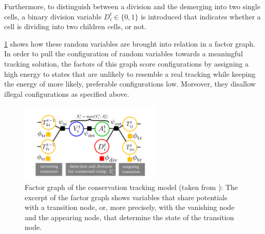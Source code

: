 Furthermore, to distinguish between a division and the demerging into two single cells, a
binary division variable $D_i^t \in \{0, 1\}$ is introduced that indicates whether a cell is dividing
into two children cells, or not.

\cref{fig:conservation-fg} shows how these random variables are brought into relation in a factor
graph. In order to pull the configuration of random variables towards a meaningful tracking
solution, the factors of this graph score configurations by assigning a high energy to states that
are unlikely to resemble a real tracking while keeping the energy of more likely, preferable
configurations low. Moreover, they disallow illegal configurations as specified above.

\begin{figure}
    \centering
    \includegraphics[width=0.6\textwidth]{images/conservation/factor_graph.png}
    \caption[Conservation tracking factor graph]{Factor graph of the conservation tracking model
        (taken from \citet{schiegg_13_conservation}): The excerpt of the factor graph shows
        variables that share potentials with a transition node, or, more precisely, with the
        vanishing node and the appearing node, that determine the state of the transition node.}
    \label{fig:conservation-fg}
\end{figure}

